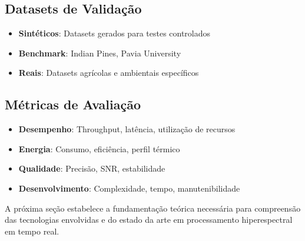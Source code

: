 \subsection{Datasets de Validação}
\begin{itemize}
    \item \textbf{Sintéticos}: Datasets gerados para testes controlados
    \item \textbf{Benchmark}: Indian Pines, Pavia University
    \item \textbf{Reais}: Datasets agrícolas e ambientais específicos
\end{itemize}

\subsection{Métricas de Avaliação}
\begin{itemize}
    \item \textbf{Desempenho}: Throughput, latência, utilização de recursos
    \item \textbf{Energia}: Consumo, eficiência, perfil térmico
    \item \textbf{Qualidade}: Precisão, SNR, estabilidade
    \item \textbf{Desenvolvimento}: Complexidade, tempo, manutenibilidade
\end{itemize}

A próxima seção estabelece a fundamentação teórica necessária para compreensão das tecnologias envolvidas e do estado da arte em processamento hiperespectral em tempo real.